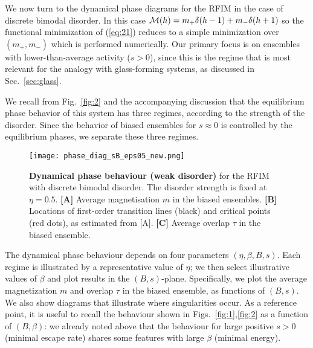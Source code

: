 \documentclass{iopart}
\newcommand{\eqref}[1]{(\ref{#1})}
\begin{document}
We now turn to the dynamical phase diagrams for the RFIM in the case of discrete bimodal disorder.
In this case ${\cal M}(h) = m_+ \delta(h-1) + m_- \delta(h+1)$ so the functional minimization of (\ref{eq:21}) reduces to a simple minimization over $(m_+,m_-)$ which is performed numerically.
%
%
Our primary focus is on ensembles with lower-than-average activity ($s>0$), since this is the regime that is most relevant for the analogy with glass-forming systems, as discussed in Sec.~\ref{sec:glass}.  


We recall from Fig.~\ref{fig:2} and the accompanying discussion that the equilibrium phase behavior of this system has three regimes, according to the strength of the disorder.  Since the behavior of biased ensembles for $s\approx 0$ is controlled by the equilibrium phases, we separate these three regimes.

\begin{figure}
  \centering
  \texttt{[image: phase\_diag\_sB\_eps05\_new.png]}
  \caption{\textbf{Dynamical phase behaviour (weak disorder)} for the RFIM with discrete bimodal disorder. The disorder strength is fixed at $\eta=0.5$. 
  \textbf{[A]} Average magnetisation $m$ in the biased ensembles. 
  \textbf{[B]} Locations of first-order transition lines (black) and critical points (red dots), as estimated from [A]. 
  \textbf{[C]} Average overlap $\tau$ in the biased ensemble.}
  \label{fig:4}
\end{figure}


The dynamical phase behaviour depends on four parameters $(\eta,\beta,B,s)$.  Each regime is illustrated by a representative value of $\eta$; we then select illustrative values of $\beta$ and plot results in the $(B,s)$-plane.
Specifically, we plot the average magnetization $m$ and overlap $\tau$ in the biased ensemble, as functions of $(B,s)$.  We also show diagrams that illustrate where singularities occur.  As a reference point, it is useful to recall the behaviour shown in Figs.~\ref{fig:1},\ref{fig:2} as a function of $(B,\beta)$: we already noted above that the behaviour for large positive $s>0$ (minimal escape rate) shares some features with large $\beta$ (minimal energy).
\end{document}
